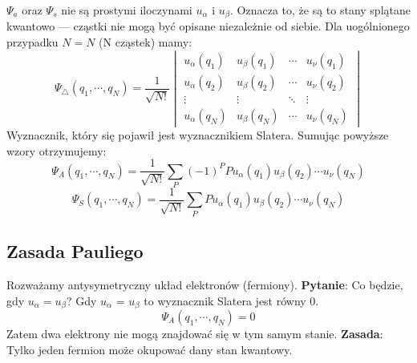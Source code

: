 %
$\Psi_a$ oraz $\Psi_s$ nie są prostymi iloczynami $u_\alpha$ i $u_\beta$.
Oznacza to, że są to stany splątane kwantowo ---
cząstki nie mogą być opisane niezależnie od siebie.
Dla uogólnionego przypadku $N = N$ (N cząstek) mamy:
%
\begin{equation*}
    \Psi_\triangle (q_1, \cdots, q_N) = \frac{1}{\sqrt{N!}}
    \begin{vmatrix}
        u_\alpha(q_1) & u_\beta(q_1) & \cdots & u_\nu(q_1) \\
        u_\alpha(q_2) & u_\beta(q_2) & \cdots & u_\nu(q_2) \\
        \vdots & \vdots & \ddots & \vdots \\
        u_\alpha(q_N) & u_\beta(q_N) & \cdots & u_\nu(q_N)
    \end{vmatrix}
\end{equation*}
%
Wyznacznik, który się pojawił jest wyznacznikiem Slatera.
%
Sumując powyższe wzory otrzymujemy:
%
\begin{equation*}
    \Psi_A (q_1, \cdots, q_N) = \frac{1}{\sqrt{N!}} \sum_{P} (-1)^{P} P u_\alpha(q_1) u_\beta(q_2) \cdots u_\nu(q_N)
\end{equation*}
%
\begin{equation*}
    \Psi_S (q_1, \cdots, q_N) = \frac{1}{\sqrt{N!}} \sum_{P} P u_\alpha(q_1) u_\beta(q_2) \cdots u_\nu(q_N)
\end{equation*}
%
\subsection{Zasada Pauliego}
%
Rozważamy antysymetryczny układ elektronów (fermiony). \textbf{Pytanie}: Co będzie, gdy $u_\alpha = u_\beta$?
%
Gdy $u_\alpha$ = $u_\beta$ to wyznacznik Slatera jest równy 0.
%
\begin{equation*}
    \Psi_A (q_1, \cdots, q_N) = 0
\end{equation*}
%
Zatem dwa elektrony nie mogą znajdować się w tym samym stanie.
%
\textbf{Zasada}: Tylko jeden fermion może okupować dany stan kwantowy.
%
